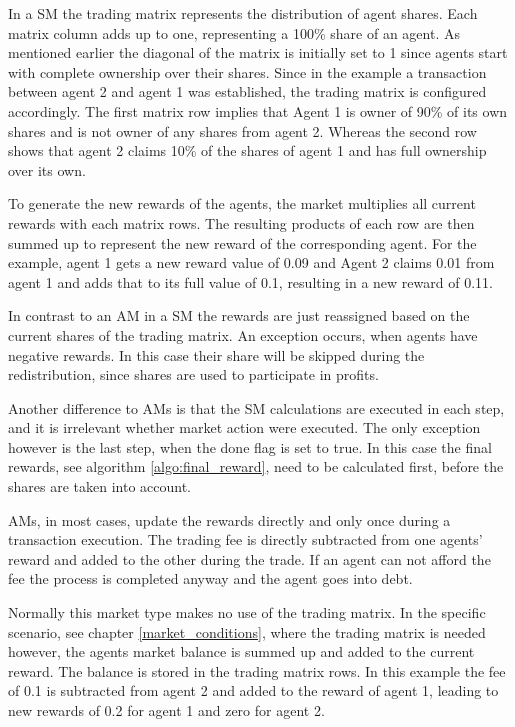 In a SM the trading matrix represents the distribution of agent shares. Each matrix column adds up to one, representing a 100\% share of an agent. As mentioned earlier the diagonal of the matrix is initially set to 1 since agents start with complete ownership over their shares. Since in the example a transaction between agent 2 and agent 1 was established, the trading matrix is configured accordingly. The first matrix row implies that Agent 1 is owner of 90\% of its own shares and is not owner of any shares from agent 2. Whereas the second row shows that agent 2 claims 10\% of the shares of agent 1 and has full ownership over its own.

To generate the new rewards of the agents, the market multiplies all current rewards with each matrix rows. The resulting products of each row are then summed up to represent the new reward of the corresponding agent. For the example, agent 1 gets a new reward value of 0.09 and Agent 2 claims 0.01 from agent 1 and adds that to its full value of 0.1, resulting in a new reward of 0.11. 

In contrast to an AM in a SM the rewards are just reassigned based on the current shares of the trading matrix. An exception occurs, when agents have negative rewards. In this case their share will be skipped during the redistribution, since shares are used to participate in profits. 

Another difference to AMs is that the SM calculations are executed in each step, and it is irrelevant whether market action were executed. The only exception however is the last step, when the done flag is set to true. In this case the final rewards, see algorithm \ref{algo:final_reward}, need to be calculated first, before the shares are taken into account.

AMs, in most cases, update the rewards directly and only once during a transaction execution. The trading fee is directly subtracted from one agents' reward and added to the other during the trade. If an agent can not afford the fee the process is completed anyway and the agent goes into debt. 

Normally this market type makes no use of the trading matrix. In the specific scenario, see chapter \ref{market_conditions}, where the trading matrix is needed however, the agents market balance is summed up and added to the current reward. The balance is stored in the trading matrix rows. In this example the fee of 0.1 is subtracted from agent 2 and added to the reward of agent 1, leading to new rewards of 0.2 for agent 1 and zero for agent 2.

